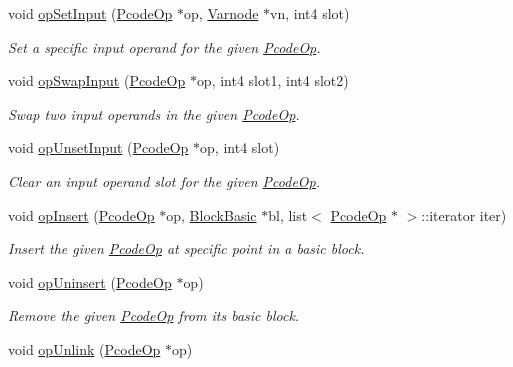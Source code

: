 \begin{DoxyCompactItemize}
void \mbox{\hyperlink{class_funcdata_aa079e2bd26e92671be79601535236a63}{op\+Set\+Input}} (\mbox{\hyperlink{class_pcode_op}{Pcode\+Op}} $\ast$op, \mbox{\hyperlink{class_varnode}{Varnode}} $\ast$vn, int4 slot)
\begin{DoxyCompactList}\small\item\em Set a specific input operand for the given \mbox{\hyperlink{class_pcode_op}{Pcode\+Op}}. \end{DoxyCompactList}\item 
void \mbox{\hyperlink{class_funcdata_a1ae30fdfbe33ecfa6668b5579ae3e82a}{op\+Swap\+Input}} (\mbox{\hyperlink{class_pcode_op}{Pcode\+Op}} $\ast$op, int4 slot1, int4 slot2)
\begin{DoxyCompactList}\small\item\em Swap two input operands in the given \mbox{\hyperlink{class_pcode_op}{Pcode\+Op}}. \end{DoxyCompactList}\item 
void \mbox{\hyperlink{class_funcdata_a16f821f09d862b3c908d2bce7530b90a}{op\+Unset\+Input}} (\mbox{\hyperlink{class_pcode_op}{Pcode\+Op}} $\ast$op, int4 slot)
\begin{DoxyCompactList}\small\item\em Clear an input operand slot for the given \mbox{\hyperlink{class_pcode_op}{Pcode\+Op}}. \end{DoxyCompactList}\item 
void \mbox{\hyperlink{class_funcdata_a6b77ee6442d79ae754d5dcf0b5318fca}{op\+Insert}} (\mbox{\hyperlink{class_pcode_op}{Pcode\+Op}} $\ast$op, \mbox{\hyperlink{class_block_basic}{Block\+Basic}} $\ast$bl, list$<$ \mbox{\hyperlink{class_pcode_op}{Pcode\+Op}} $\ast$ $>$\+::iterator iter)
\begin{DoxyCompactList}\small\item\em Insert the given \mbox{\hyperlink{class_pcode_op}{Pcode\+Op}} at specific point in a basic block. \end{DoxyCompactList}\item 
void \mbox{\hyperlink{class_funcdata_aacf0cf87976170d62df42411ffe1e10a}{op\+Uninsert}} (\mbox{\hyperlink{class_pcode_op}{Pcode\+Op}} $\ast$op)
\begin{DoxyCompactList}\small\item\em Remove the given \mbox{\hyperlink{class_pcode_op}{Pcode\+Op}} from its basic block. \end{DoxyCompactList}\item 
void \mbox{\hyperlink{class_funcdata_a495ebac694bc98d041e29ce05eece6f9}{op\+Unlink}} (\mbox{\hyperlink{class_pcode_op}{Pcode\+Op}} $\ast$op)

\end{DoxyCompactItemize}
